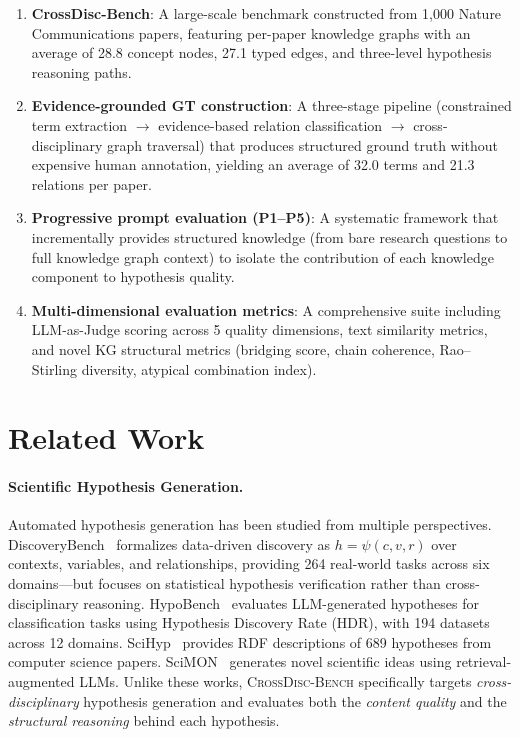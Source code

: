 \documentclass{article}
\newcommand{\ours}{\textsc{CrossDisc-Bench}}
\begin{document}
\begin{enumerate}[leftmargin=*,topsep=2pt,itemsep=1pt]
\item \textbf{CrossDisc-Bench}: A large-scale benchmark constructed from 1{,}000 Nature Communications papers, featuring per-paper knowledge graphs with an average of 28.8 concept nodes, 27.1 typed edges, and three-level hypothesis reasoning paths.
\item \textbf{Evidence-grounded GT construction}: A three-stage pipeline (constrained term extraction $\to$ evidence-based relation classification $\to$ cross-disciplinary graph traversal) that produces structured ground truth without expensive human annotation, yielding an average of 32.0 terms and 21.3 relations per paper.
\item \textbf{Progressive prompt evaluation (P1--P5)}: A systematic framework that incrementally provides structured knowledge (from bare research questions to full knowledge graph context) to isolate the contribution of each knowledge component to hypothesis quality.
\item \textbf{Multi-dimensional evaluation metrics}: A comprehensive suite including LLM-as-Judge scoring across 5 quality dimensions, text similarity metrics, and novel KG structural metrics (bridging score, chain coherence, Rao--Stirling diversity, atypical combination index).
\end{enumerate}

\section{Related Work}
\label{sec:related}

\paragraph{Scientific Hypothesis Generation.}
Automated hypothesis generation has been studied from multiple perspectives.
DiscoveryBench~\cite{majumder2024discoverybench} formalizes data-driven discovery as $h = \psi(c, v, r)$ over contexts, variables, and relationships, providing 264 real-world tasks across six domains---but focuses on statistical hypothesis verification rather than cross-disciplinary reasoning.
HypoBench~\cite{liu2025hypobench} evaluates LLM-generated hypotheses for classification tasks using Hypothesis Discovery Rate (HDR), with 194 datasets across 12 domains.
SciHyp~\cite{dessi2024scihyp} provides RDF descriptions of 689 hypotheses from computer science papers.
SciMON~\cite{wang2023scimon} generates novel scientific ideas using retrieval-augmented LLMs.
Unlike these works, \ours{} specifically targets \emph{cross-disciplinary} hypothesis generation and evaluates both the \emph{content quality} and the \emph{structural reasoning} behind each hypothesis.
\end{document}
